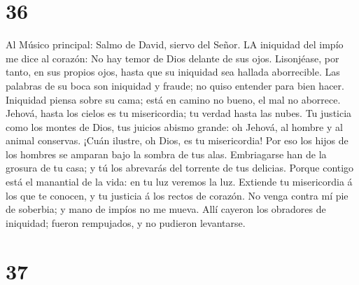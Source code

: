 \hypertarget{section-35}{%
\section{36}\label{section-35}}

 Al Músico principal: Salmo de David, siervo del Señor. LA
iniquidad del impío me dice al corazón: No hay temor de Dios delante de
sus ojos.  Lisonjéase, por tanto, en sus propios ojos, hasta
que su iniquidad sea hallada aborrecible.  Las palabras de
su boca son iniquidad y fraude; no quiso entender para bien hacer.
 Iniquidad piensa sobre su cama; está en camino no bueno, el
mal no aborrece.  Jehová, hasta los cielos es tu
misericordia; tu verdad hasta las nubes.  Tu justicia como
los montes de Dios, tus juicios abismo grande: oh Jehová, al hombre y al
animal conservas.  ¡Cuán ilustre, oh Dios, es tu
misericordia! Por eso los hijos de los hombres se amparan bajo la sombra
de tus alas.  Embriagarse han de la grosura de tu casa; y tú
los abrevarás del torrente de tus delicias.  Porque contigo
está el manantial de la vida: en tu luz veremos la luz. 
Extiende tu misericordia á los que te conocen, y tu justicia á los
rectos de corazón.  No venga contra mí pie de soberbia; y
mano de impíos no me mueva.  Allí cayeron los obradores de
iniquidad; fueron rempujados, y no pudieron levantarse.

\hypertarget{section-36}{%
\section{37}\label{section-36}}

